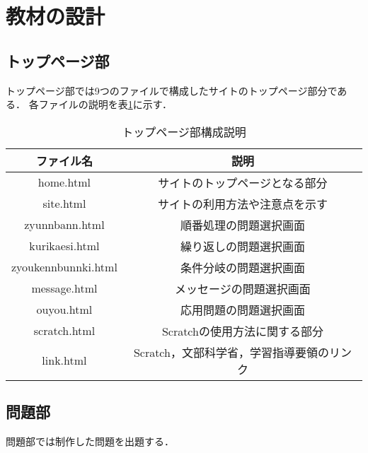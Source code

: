 \clearpage

\section{\rm 教材の設計}

\subsection{トップページ部}
トップページ部では9つのファイルで構成したサイトのトップページ部分である．
各ファイルの説明を表\ref{tab:topsetumei}に示す．
\begin{table}[htb]
\begin{center}
    \caption{トップページ部構成説明}
  \begin{tabular}{|c|c|} \hline
     ファイル名  & 説明  \\ \hline
     home.html& サイトのトップページとなる部分 \\ \hline
     site.html& サイトの利用方法や注意点を示す \\ \hline
     zyunnbann.html& 順番処理の問題選択画面 \\ \hline
     kurikaesi.html& 繰り返しの問題選択画面 \\ \hline
     zyoukennbunnki.html& 条件分岐の問題選択画面 \\ \hline
     message.html& メッセージの問題選択画面 \\ \hline
     ouyou.html& 応用問題の問題選択画面 \\ \hline
     scratch.html& Scratchの使用方法に関する部分 \\ \hline
     link.html& Scratch，文部科学省，学習指導要領のリンク\\ \hline
  \end{tabular}
  \label{tab:topsetumei}
  \end{center}
\end{table}
\newpage

\subsection{問題部}
問題部では制作した問題を出題する．

